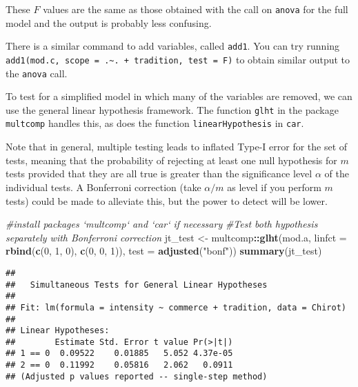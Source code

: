 \documentclass[]{book}
\newenvironment{Shaded}{\begin{snugshade}}{\end{snugshade}}
\newcommand{\CommentTok}[1]{\textcolor[rgb]{0.56,0.35,0.01}{\textit{#1}}}
\newcommand{\DataTypeTok}[1]{\textcolor[rgb]{0.13,0.29,0.53}{#1}}
\newcommand{\DecValTok}[1]{\textcolor[rgb]{0.00,0.00,0.81}{#1}}
\newcommand{\KeywordTok}[1]{\textcolor[rgb]{0.13,0.29,0.53}{\textbf{#1}}}
\newcommand{\NormalTok}[1]{#1}
\newcommand{\OperatorTok}[1]{\textcolor[rgb]{0.81,0.36,0.00}{\textbf{#1}}}
\newcommand{\StringTok}[1]{\textcolor[rgb]{0.31,0.60,0.02}{#1}}
\theoremstyle{definition}
\theoremstyle{definition}
\theoremstyle{definition}
\theoremstyle{remark}
\begin{document}
These \(F\) values are the same as those obtained with the call on
\texttt{anova} for the full model and the output is probably less
confusing.

There is a similar command to add variables, called \texttt{add1}. You
can try running
\texttt{add1(mod.c,\ scope\ =\ .\textasciitilde{}.\ +\ tradition,\ test\ =\ \textquotesingle{}F\textquotesingle{})}
to obtain similar output to the \texttt{anova} call.

To test for a simplified model in which many of the variables are
removed, we can use the general linear hypothesis framework. The
function \texttt{glht} in the package \texttt{multcomp} handles this, as
does the function \texttt{linearHypothesis} in \texttt{car}.

Note that in general, multiple testing leads to inflated Type-I error
for the set of tests, meaning that the probability of rejecting at least
one null hypothesis for \(m\) tests provided that they are all true is
greater than the significance level \(\alpha\) of the individual tests.
A Bonferroni correction (take \(\alpha/m\) as level if you perform \(m\)
tests) could be made to alleviate this, but the power to detect will be
lower.

\begin{Shaded}
\begin{Highlighting}[]
\CommentTok{#install packages `multcomp` and `car` if necessary}
\CommentTok{#Test both hypothesis separately with Bonferroni correction}
\NormalTok{jt_test <-}\StringTok{ }\NormalTok{multcomp}\OperatorTok{::}\KeywordTok{glht}\NormalTok{(mod.a, }\DataTypeTok{linfct =} \KeywordTok{rbind}\NormalTok{(}\KeywordTok{c}\NormalTok{(}\DecValTok{0}\NormalTok{, }\DecValTok{1}\NormalTok{, }\DecValTok{0}\NormalTok{), }\KeywordTok{c}\NormalTok{(}\DecValTok{0}\NormalTok{, }\DecValTok{0}\NormalTok{, }\DecValTok{1}\NormalTok{)), }
                          \DataTypeTok{test =} \KeywordTok{adjusted}\NormalTok{(}\StringTok{"bonf"}\NormalTok{))}
\KeywordTok{summary}\NormalTok{(jt_test)}
\end{Highlighting}
\end{Shaded}

\begin{verbatim}
## 
##   Simultaneous Tests for General Linear Hypotheses
## 
## Fit: lm(formula = intensity ~ commerce + tradition, data = Chirot)
## 
## Linear Hypotheses:
##        Estimate Std. Error t value Pr(>|t|)
## 1 == 0  0.09522    0.01885   5.052 4.37e-05
## 2 == 0  0.11992    0.05816   2.062   0.0911
## (Adjusted p values reported -- single-step method)
\end{verbatim}
\end{document}
